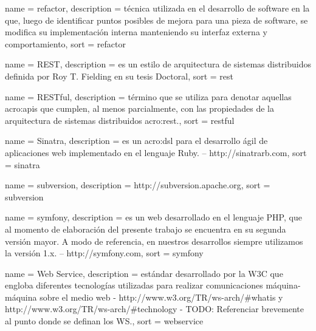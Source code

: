  {
  name = {refactor},
  description = {técnica utilizada en el desarrollo de software en la que, luego de identificar puntos posibles de mejora para una pieza de software, se modifica su implementación interna manteniendo su interfaz externa y comportamiento},
  sort = {refactor}
}

 {
  name = {REST},
  description = {es un estilo de arquitectura de sistemas distribuidos definida por Roy T. Fielding en su tesis Doctoral},
  sort = {rest}
}

 {
  name = {RESTful},
  description = {término que se utiliza para denotar aquellas \glspl{acro:api} que cumplen, al menos parcialmente, con las propiedades de la arquitectura de sistemas distribuidos \gls{acro:rest}.},
  sort = {restful}
}

 {
  name = {Sinatra},
  description = {es un \gls{acro:dsl} para el desarrollo ágil de aplicaciones web implementado en el lenguaje Ruby. – http://sinatrarb.com},
  sort = {sinatra}
}

 {
  name = {subversion},
  description = {http://subversion.apache.org},
  sort = {subversion}
}

 {
  name = {symfony},
  description = {es un  web desarrollado en el lenguaje PHP, que al momento de elaboración del presente trabajo se encuentra en su segunda versión mayor. A modo de referencia, en nuestros desarrollos siempre utilizamos la versión 1.x. – http://symfony.com},
  sort = {symfony}
}

 {
  name = {Web Service},
  description = {estándar desarrollado por la W3C que engloba diferentes tecnologías utilizadas para realizar comunicaciones máquina-máquina sobre el medio web - http://www.w3.org/TR/ws-arch/\#whatis y http://www.w3.org/TR/ws-arch/\#technology - TODO: Referenciar brevemente al punto donde se definan los WS.},
  sort = {webservice}
}

